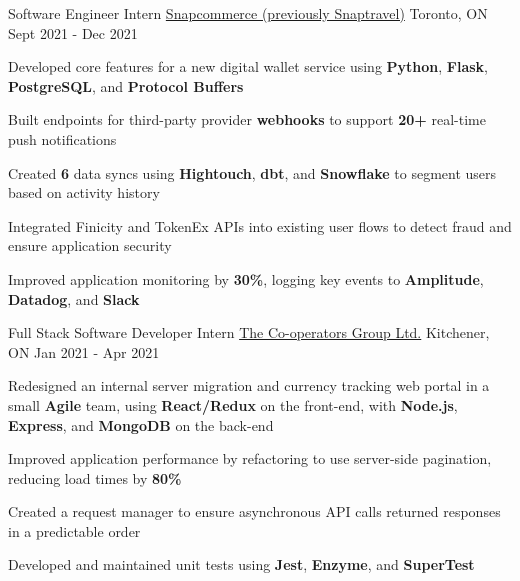 
\begin{cventries}
  \cventry
    {Software Engineer Intern} %
    {\href{https://www.snapcommerce.com/}{Snapcommerce (previously Snaptravel)}} %
    {Toronto, ON} %
    {Sept 2021 - Dec 2021} %
    {
      \begin{cvitems} %
      \item {Developed core features for a new digital wallet service using \textbf{Python}, \textbf{Flask}, \textbf{PostgreSQL}, and \textbf{Protocol Buffers}}
      \item {Built endpoints for third-party provider \textbf{webhooks} to support \textbf{20+} real-time push notifications}
      \item {Created \textbf{6} data syncs using \textbf{Hightouch}, \textbf{dbt}, and \textbf{Snowflake} to segment users based on activity history}
      \item {Integrated Finicity and TokenEx APIs into existing user flows to detect fraud and ensure application security}
      \item {Improved application monitoring by \textbf{30\%}, logging key events to \textbf{Amplitude}, \textbf{Datadog}, and \textbf{Slack}}
      \end{cvitems}
    }

  \cventry
    {Full Stack Software Developer Intern} %
    {\href{https://www.cooperators.ca/}{The Co-operators Group Ltd.}} %
    {Kitchener, ON} %
    {Jan 2021 - Apr 2021} %
    {
      \begin{cvitems} %
      \item {Redesigned an internal server migration and currency tracking web portal in a small \textbf{Agile} team, using \textbf{React/Redux} on the front-end, with \textbf{Node.js}, \textbf{Express}, and \textbf{MongoDB} on the back-end}
      \item {Improved application performance by refactoring to use server-side pagination, reducing load times by \textbf{80\%}}
      \item {Created a request manager to ensure asynchronous API calls returned responses in a predictable order}
      \item {Developed and maintained unit tests using \textbf{Jest}, \textbf{Enzyme}, and \textbf{SuperTest}}
      \end{cvitems}
    }
    

\end{cventries}
